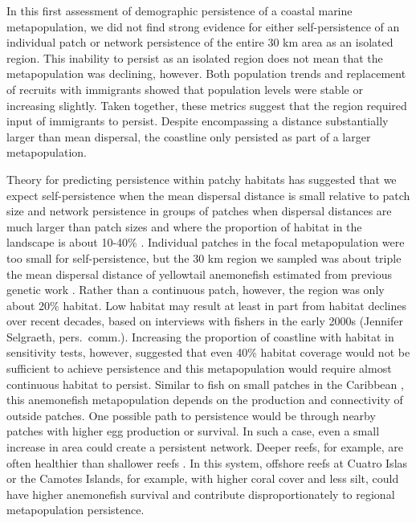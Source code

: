 \documentclass[12pt, oneside]{article}   	%
\begin{document}
In this first assessment of demographic persistence of a coastal marine metapopulation, we did not find strong evidence for either self-persistence of an individual patch or network persistence of the entire 30 km area as an isolated region. This inability to persist as an isolated region does not mean that the metapopulation was declining, however. Both population trends and replacement of recruits with immigrants showed that population levels were stable or increasing slightly. Taken together, these metrics suggest that the region required input of immigrants to persist. Despite encompassing a distance substantially larger than mean dispersal, the coastline only persisted as part of a larger metapopulation.

Theory for predicting persistence within patchy habitats has suggested that we expect self-persistence when the mean dispersal distance is small relative to patch size and network persistence in groups of patches when dispersal distances are much larger than patch sizes and where the proportion of habitat in the landscape is about 10-40\% \citep[depending on the particular species, population, and maximum reproductive rate,][]{botsford2019population}. Individual patches in the focal metapopulation were too small for self-persistence, but the 30 km region we sampled was about triple the mean dispersal distance of yellowtail anemonefish estimated from previous genetic work \citep[8-9 km,][]{pinsky2010using, catalanoInPrepconnectivity}. Rather than a continuous patch, however, the region was only about 20\% habitat. Low habitat may result at least in part from habitat declines over recent decades, based on interviews with fishers in the early 2000s (Jennifer Selgraeth, pers.\ comm.). Increasing the proportion of coastline with habitat in sensitivity tests, however, suggested that even 40\% habitat coverage would not be sufficient to achieve persistence and this metapopulation would require almost continuous habitat to persist. Similar to fish on small patches in the Caribbean \citep{johnson2018integrating}, this anemonefish metapopulation depends on the production and connectivity of outside patches. One possible path to persistence would be through nearby patches with higher egg production or survival. In such a case, even a small increase in area could create a persistent network. Deeper reefs, for example, are often healthier than shallower reefs \citep{cinner2016bright}. In this system, offshore reefs at Cuatro Islas or the Camotes Islands, for example, with higher coral cover and less silt, could have higher anemonefish survival and contribute disproportionately to regional metapopulation persistence. %
\end{document}
